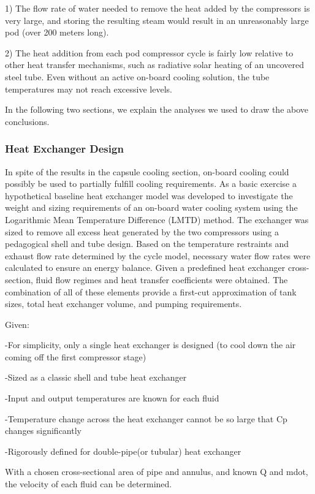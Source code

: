 \documentclass[heading.tex]{subfiles}
\begin{document}
1) The flow rate of water needed to remove the heat added by the compressors is very large, and storing the resulting steam would result
in an unreasonably large pod (over 200 meters long).

2) The heat addition from each pod compressor cycle is fairly low relative to other heat transfer mechanisms, such as radiative solar
heating of an uncovered steel tube. Even without an active on-board cooling solution, the tube temperatures may not reach excessive
levels.

In the following two sections, we explain the analyses we used to draw the above conclusions.

\subsubsection{Heat Exchanger Design}

In spite of the results in the capsule cooling section, on-board cooling could possibly be used to partially fulfill cooling requirements. As a
basic exercise a hypothetical baseline heat exchanger model was developed to investigate the weight and sizing requirements of an 
on-board water cooling system using the Logarithmic Mean Temperature Difference (LMTD) method. \cite{Cengal} \cite{Turns} The
exchanger was sized to remove all excess heat generated by the two compressors using a pedagogical shell and tube design. Based on the
temperature restraints and exhaust flow rate determined by the cycle model, necessary water flow rates were calculated to ensure an
energy balance. Given a predefined heat exchanger cross-section, fluid flow regimes and heat transfer coefficients were obtained. The
combination of all of these elements provide a first-cut approximation of tank sizes, total heat exchanger volume, and pumping
requirements.

Given:

-For simplicity, only a single heat exchanger is designed (to cool down the air coming off the first compressor stage)

-Sized as a classic shell and tube heat exchanger

-Input and output temperatures are known for each fluid

-Temperature change across the heat exchanger cannot be so large that Cp changes significantly

-Rigorously defined for double-pipe(or tubular) heat exchanger

With a chosen cross-sectional area of pipe and annulus, and known Q and mdot, the velocity of each fluid can be determined.
\end{document}
